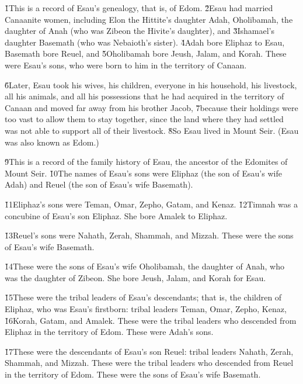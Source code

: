 \v{1}This is a record of Esau's genealogy, that is, of Edom. \v{2}Esau had married Canaanite women, including Elon the Hittite's daughter Adah, Oholibamah, the daughter of Anah (who was Zibeon the Hivite's daughter), and \v{3}Ishamael's daughter Basemath (who was Nebaioth's sister). \v{4}Adah bore Eliphaz to Esau, Basemath bore Reuel, and \v{5}Oholibamah bore Jeush, Jalam, and Korah. These were Esau's sons, who were born to him in the territory of Canaan.

\v{6}Later, Esau took his wives, his children, everyone in his household, his livestock, all his animals, and all his possessions that he had acquired in the territory of Canaan and moved far away from his brother Jacob, \v{7}because their holdings were too vast to allow them to stay together, since the land where they had settled was not able to support all of their livestock. \v{8}So Esau lived in Mount Seir. (Esau was also known as Edom.)

\v{9}This is a record of the family history of Esau, the ancestor of the Edomites of Mount Seir. \v{10}The names of Esau's sons were Eliphaz (the son of Esau's wife Adah) and Reuel (the son of Esau's wife Basemath).

\v{11}Eliphaz's sons were Teman, Omar, Zepho, Gatam, and Kenaz. \v{12}Timnah was a concubine of Esau's son Eliphaz. She bore Amalek to Eliphaz.

\v{13}Reuel's sons were Nahath, Zerah, Shammah, and Mizzah. These were the sons of Esau's wife Basemath.

\v{14}These were the sons of Esau's wife Oholibamah, the daughter of Anah, who was the daughter of Zibeon. She bore Jeush, Jalam, and Korah for Esau.

\v{15}These were the tribal leaders of Esau's descendants; that is, the children of Eliphaz, who was Esau's firstborn: tribal leaders Teman, Omar, Zepho, Kenaz, \v{16}Korah, Gatam, and Amalek. These were the tribal leaders who descended from Eliphaz in the territory of Edom. These were Adah's sons.

\v{17}These were the descendants of Esau's son Reuel: tribal leaders Nahath, Zerah, Shammah, and Mizzah. These were the tribal leaders who descended from Reuel in the territory of Edom. These were the sons of Esau's wife Basemath.

